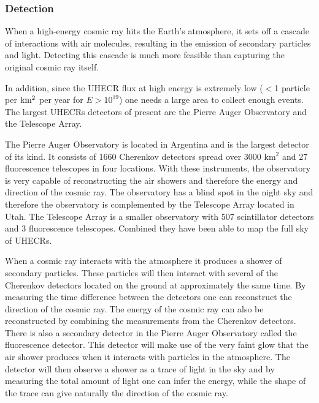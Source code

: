 




\subsubsection{Detection}
When a high-energy cosmic ray hits the Earth's atmosphere, it sets off a cascade of interactions with air molecules, resulting in the emission of secondary particles and light. Detecting this cascade is much more feasible than capturing the original cosmic ray itself.

In addition, since the UHECR flux at high energy is extremely low ($<$1 particle per $\rm km^2$ per year for $E > 10^{19}$) one needs a large area to collect enough events. The largest UHECRs detectors of present are the Pierre Auger Observatory and the Telescope Array.

The Pierre Auger Observatory is located in Argentina and is the largest detector of its kind. It consists of 1660 Cherenkov detectors spread over 3000 km$^2$ and 27 fluorescence telescopes in four locations. With these instruments, the observatory is very capable of reconstructing the air showers and therefore the energy and direction of the cosmic ray. The observatory has a blind spot in the night sky and therefore the observatory is complemented by the Telescope Array located in Utah. The Telescope Array is a smaller observatory with 507 scintillator detectors and 3 fluorescence telescopes. Combined they have been able to map the full sky of UHECRs.

When a cosmic ray interacts with the atmosphere it produces a shower of secondary particles. These particles will then interact with several of the Cherenkov detectors located on the ground at approximately the same time. By measuring the time difference between the detectors one can reconstruct the direction of the cosmic ray. The energy of the cosmic ray can also be reconstructed by combining the measurements from the Cherenkov detectors. There is also a secondary detector in the Pierre Auger Observatory called the fluorescence detector. This detector will make use of the very faint glow that the air shower produces when it interacts with particles in the atmosphere. The detector will then observe a shower as a trace of light in the sky and by measuring the total amount of light one can infer the energy, while the shape of the trace can give naturally the direction of the cosmic ray.

